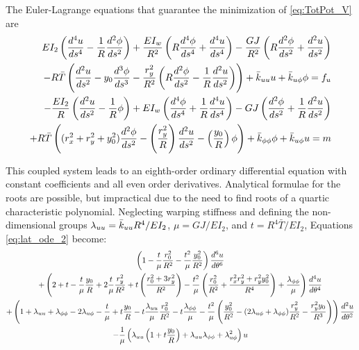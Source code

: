 \documentclass[\rootdir/thesis.tex]{subfiles}
\begin{document}
The Euler-Lagrange equations that guarantee the minimization of \eqref{eq:TotPot_V} are
\begin{subequations}
\label{eq:lat_ode_2}
\begin{align}
\begin{split}
  EI_2\left( \frac{d^4u}{ds^4} - \frac{1}{R}\frac{d^2\phi}{ds^2} \right)
  + \frac{EI_w}{R^2}\left( R\frac{d^4\phi}{ds^4} + \frac{d^4u}{ds^4} \right)
  - \frac{GJ}{R^2}\left( R\frac{d^2\phi}{ds^2} + \frac{d^2u}{ds^2} \right)\\
  - R\bar{T}\left( \frac{d^2u}{ds^2} - y_0\frac{d^3\phi}{ds^3}
                  -\frac{r_y^2}{R^2}\left(R\frac{d^2\phi}{ds^2}
                  -\frac{1}{R}\frac{d^2u}{ds^2}\right) \right)
  + \bar{k}_{uu} u + \bar{k}_{u\phi} \phi = f_u
\end{split}\\
\begin{split}
  - \frac{EI_2}{R}\left( \frac{d^2u}{ds^2} - \frac{1}{R}\phi \right)
  + EI_w\left( \frac{d^4\phi}{ds^4} + \frac{1}{R}\frac{d^4u}{ds^4} \right)
  - GJ\left( \frac{d^2\phi}{ds^2} + \frac{1}{R}\frac{d^2u}{ds^2} \right)\\
  + R\bar{T}\left((r_x^2+r_y^2+y_0^2)\frac{d^2\phi}{ds^2}
                  -\left(\frac{r_y^2}{R}\right)\frac{d^2u}{ds^2}
                  -\left(\frac{y_0}{R}\right)\phi\right)
  + \bar{k}_{\phi\phi} \phi + \bar{k}_{u\phi} u = m
\end{split}
\end{align}
\end{subequations}

This coupled system leads to an eighth-order ordinary differential equation with constant coefficients and all even order derivatives. Analytical formulae for the roots are possible, but impractical due to the need to find roots of a quartic characteristic polynomial. Neglecting warping stiffness and defining the non-dimensional groups $\lambda_{uu}=\bar{k}_{uu} R^4/EI_2$, $\mu=GJ/EI_2$, and $t=R^4\bar{T}/EI_2$, Equations \eqref{eq:lat_ode_2} become:
\begin{multline}
\label{eq:lat_ode_full}
  \left(1-\frac{t}{\mu}\frac{r_0^2}{R^2} - \frac{t^2}{\mu}\frac{y_0^2}{R^2}\right)\frac{d^6u}{d\theta^6}\\
  +\left(2+t-\frac{t}{\mu}\frac{y_0}{R} + 2\frac{t}{\mu}\frac{r_y^2}{R^2}
         +t\left(\frac{r_0^2 + 3r_y^2}{R^2}\right)
         -\frac{t^2}{\mu}\left(\frac{r_0^2}{R^2}+\frac{r_x^2r_y^2+r_y^2y_0^2}{R^4}\right)
         +\frac{\lambda_{\phi\phi}}{\mu}\right) \frac{d^4u}{d\theta^4}\\
  +\left(1+\lambda_{uu}+\lambda_{\phi\phi}-2\lambda_{u\phi}
         -\frac{t}{\mu}+t\frac{y_0}{R}-t\frac{\lambda_{uu}}{\mu}\frac{r_0^2}{R^2}
         -t\frac{\lambda_{\phi\phi}}{\mu}
         -\frac{t^2}{\mu}\left(\frac{y_0^2}{R^2}-(2\lambda_{u\phi}+\lambda_{\phi\phi})\frac{r_y^2}{R^2} - \frac{r_y^2y_0}{R^3}\right)
         \right)\frac{d^2u}{d\theta^2}\\
  -\frac{1}{\mu}\left(\lambda_{uu}\left(1+t\frac{y_0}{R}\right)
                      +\lambda_{uu}\lambda_{\phi\phi} + \lambda_{u\phi}^2\right)u
\end{multline}
\end{document}
